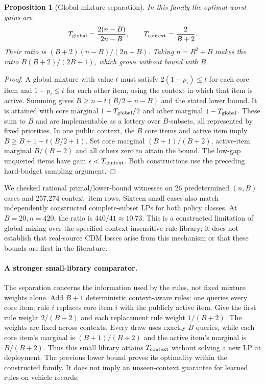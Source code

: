 \documentclass[11pt]{article}
\newtheorem{proposition}{Proposition}
\begin{document}
\begin{proposition}[Global-mixture separation]
In this family the optimal worst gains are
\[
 T_{\rm global}=\frac{2(n-B)}{2n-B},\qquad
 T_{\rm context}=\frac{2}{B+2}.
\]
Their ratio is $(B+2)(n-B)/(2n-B)$. Taking $n=B^2+B$ makes the ratio
$B(B+2)/(2B+1)$, which grows without bound with $B$.
\end{proposition}
\begin{proof}
A global mixture with value $t$ must satisfy $2(1-p_i)\le t$ for each core
item and $1-p_i\le t$ for each other item, using the context in which that
item is active. Summing gives $B\ge n-t(B/2+n-B)$ and the stated lower bound.
It is attained with core marginal $1-T_{\rm global}/2$ and other marginal
$1-T_{\rm global}$. These sum to $B$ and are implementable as a lottery over
$B$-subsets, all represented by fixed priorities. In one public context, the
$B$ core items and active item imply $B\ge B+1-t(B/2+1)$. Set core marginal
$(B+1)/(B+2)$, active-item marginal $B/(B+2)$ and all others zero to attain the
bound. The low-gap unqueried items have gain $\epsilon<T_{\rm context}$.
Both constructions use the preceding hard-budget sampling argument.
\end{proof}

We checked rational primal/lower-bound witnesses on 26 predetermined $(n,B)$
cases and 257,274 context--item rows. Sixteen small cases also match independently
constructed complete-subset LPs for both policy classes. At $B=20,n=420$, the
ratio is $440/41\approx10.73$. This is a constructed limitation of global mixing over the specified
context-insensitive rule library; it does not establish that real-source
CDM losses arise from this mechanism or that these bounds are first in the literature.

\paragraph{A stronger small-library comparator.}
The separation concerns the information used by the rules, not fixed mixture
weights alone. Add $B+1$ deterministic context-aware rules: one queries every
core item; rule $i$ replaces core item $i$ with the publicly active item.
Give the first rule weight $2/(B+2)$ and each replacement rule weight $1/(B+2)$.
The weights are fixed across contexts. Every draw uses exactly $B$ queries,
while each core item's marginal is $(B+1)/(B+2)$ and the active item's marginal
is $B/(B+2)$. Thus this small library attains $T_{\rm context}$ without solving
a new LP at deployment. The previous lower bound proves its optimality within
the constructed family. It does not imply an unseen-context guarantee for
learned rules on vehicle records.
\end{document}

